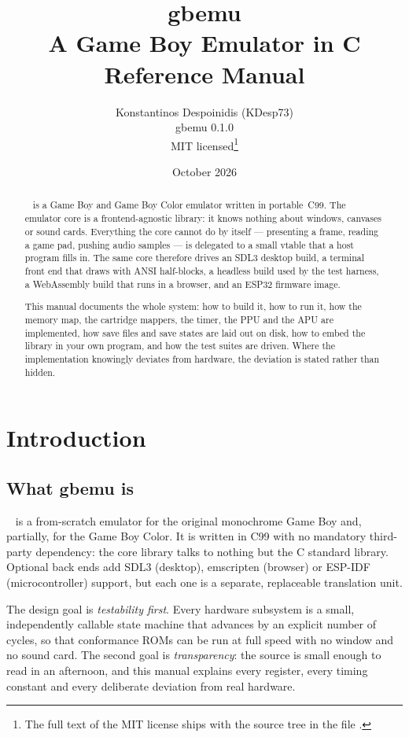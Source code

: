 \documentclass[twoside,a4paper]{refart}
\title{gbemu\\
\large A Game Boy Emulator in C\\
\large Reference Manual}
\author{Konstantinos Despoinidis (KDesp73)\\
gbemu 0.1.0\\
MIT licensed\thanks{The full text of the MIT license ships with the
source tree in the file \fname{LICENSE}.}}
\date{October 2026}
\DeclareRobustCommand\fname[1]{%
  \texttt{\edef\gbemudetok{\detokenize{#1}}%
         \expandafter\seqsplit\expandafter{\gbemudetok}}}
\begin{document}
\maketitle

\begin{abstract}
    \fname{gbemu} is a Game Boy and Game Boy Color emulator written in
    portable~C99.  The emulator core is a frontend-agnostic library: it
    knows nothing about windows, canvases or sound cards.  Everything the
    core cannot do by itself --- presenting a frame, reading a game pad,
    pushing audio samples --- is delegated to a small vtable that a host
    program fills in.  The same core therefore drives an SDL3 desktop
    build, a terminal front end that draws with ANSI half-blocks, a
    headless build used by the test harness, a WebAssembly build that runs
    in a browser, and an ESP32 firmware image.

    This manual documents the whole system: how to build it, how to run it,
    how the memory map, the cartridge mappers, the timer, the PPU and the
    APU are implemented, how save files and save states are laid out on
    disk, how to embed the library in your own program, and how the test
    suites are driven.  Where the implementation knowingly deviates from
    hardware, the deviation is stated rather than hidden.
\end{abstract}

\tableofcontents

\newpage

\section{Introduction}
\label{intro}

\subsection{What gbemu is}

\fname{gbemu} is a from-scratch emulator for the original monochrome Game
Boy and, partially, for the Game Boy Color.  It is written in C99 with no
mandatory third-party dependency: the core library talks to nothing but
the C standard library.  Optional back ends add SDL3 (desktop), emscripten
(browser) or ESP-IDF (microcontroller) support, but each one is a
separate, replaceable translation unit.

The design goal is \emph{testability first}.  Every hardware subsystem is
a small, independently callable state machine that advances by an explicit
number of cycles, so that conformance ROMs can be run at full speed with
no window and no sound card.  The second goal is \emph{transparency}: the
source is small enough to read in an afternoon, and this manual explains
every register, every timing constant and every deliberate deviation from
real hardware.
\end{document}
